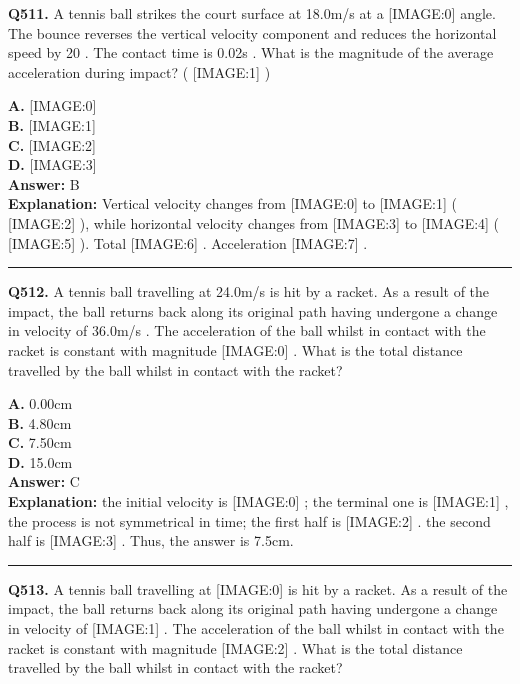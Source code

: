 \documentclass[12pt]{article}
\begin{document}
\noindent
\textbf{Q511.} A tennis ball strikes the court surface at 18.0m/s
at a
[IMAGE:0]
angle. The bounce reverses the vertical velocity component and reduces the horizontal speed by 20%
. The contact time is 0.02s
.
What is the magnitude of the average acceleration during impact? (
[IMAGE:1]
)



\textbf{A.} [IMAGE:0] \\
\textbf{B.} [IMAGE:1] \\
\textbf{C.} [IMAGE:2] \\
\textbf{D.} [IMAGE:3] \\

\textbf{Answer:} B \\
\textbf{Explanation:} Vertical velocity changes from
[IMAGE:0]
to
[IMAGE:1]
(
[IMAGE:2]
), while horizontal velocity changes from
[IMAGE:3]
to
[IMAGE:4]
(
[IMAGE:5]
). Total
[IMAGE:6]
. Acceleration
[IMAGE:7]
.

\hrule
\vspace{1em}


\noindent
\textbf{Q512.} A tennis ball travelling at 24.0m/s
is hit by a racket. As a result of the impact, the ball returns back along its original path having undergone a change in velocity of 36.0m/s
. The acceleration of the ball whilst in contact with the racket is constant with magnitude
[IMAGE:0]
.
What is the total distance travelled by the ball whilst in contact with the racket?



\textbf{A.} 0.00cm \\
\textbf{B.} 4.80cm \\
\textbf{C.} 7.50cm \\
\textbf{D.} 15.0cm \\

\textbf{Answer:} C \\
\textbf{Explanation:} the initial velocity is
[IMAGE:0]
; the terminal one is
[IMAGE:1]
, the process is not symmetrical in time;
the first half is
[IMAGE:2]
.
the second half is
[IMAGE:3]
.
Thus, the answer is 7.5cm.

\hrule
\vspace{1em}


\noindent
\textbf{Q513.} A tennis ball travelling at
[IMAGE:0]
is hit by a racket. As a result of the impact, the ball returns back along its original path having undergone a change in velocity of
[IMAGE:1]
. The acceleration of the ball whilst in contact with the racket is constant with magnitude
[IMAGE:2]
.
What is the total distance travelled by the ball whilst in contact with the racket?
\end{document}
